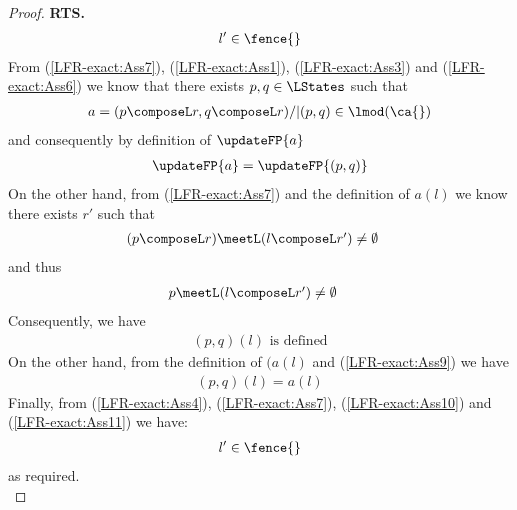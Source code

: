 \begin{lemma}
\begin{proof}
%
\textbf{RTS. }
\begin{align*}
	l' \in \fence{} 
\end{align*}
From (\ref{LFR-exact:Ass7}), (\ref{LFR-exact:Ass1}), (\ref{LFR-exact:Ass3}) and (\ref{LFR-exact:Ass6}) we know that there exists $p, q \in \LStates$  such that 
%
\begin{align}
	a = (p \composeL r, q \composeL r) /| (p, q) \in \lmod(\ca{})
	\label{LFR-exact:Ass8}
\end{align}
%
and consequently by definition of $\updateFP{a}$
%
\begin{align}
	\updateFP{a} = \updateFP{(p, q)}
	\label{LFR-exact:Ass9}
\end{align}
%
On the other hand, from (\ref{LFR-exact:Ass7}) and the definition of $a(l)$ we know there exists $r'$ such that 
\begin{align*}
&
\begin{array}{@{} l @{}}
	(p \composeL r) \meetL (l \composeL r') \not= \emptyset
\end{array}
\end{align*}
% 
and thus 
%
\begin{align*}
&
\begin{array}{@{} l @{}}
	p \meetL (l \composeL r') \not= \emptyset
\end{array}
\end{align*}
% 
Consequently, we have
\begin{align}
	(p, q)(l) \text{ is defined}
	\label{LFR-exact:Ass10}
\end{align}
On the other hand, from the definition of $(a(l)$ and (\ref{LFR-exact:Ass9}) we have 
%
\begin{align}
	(p, q)(l) = a(l)
	\label{LFR-exact:Ass11}
\end{align}
%
Finally, from (\ref{LFR-exact:Ass4}), (\ref{LFR-exact:Ass7}), (\ref{LFR-exact:Ass10}) and (\ref{LFR-exact:Ass11}) we have:
%
\begin{align*}
	l' \in \fence{}
\end{align*}
%
as required.\\



\end{proof}
\end{lemma}